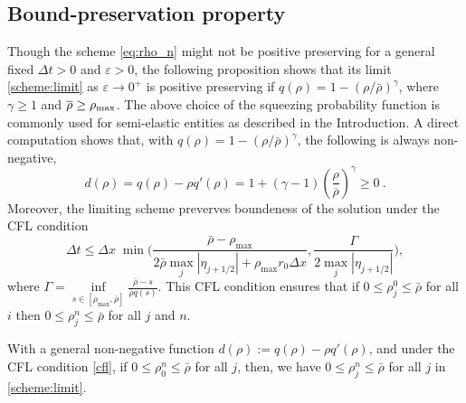 \documentclass[review,onefignum,onetabnum]{siamart220329}
\newcommand {\e}  {\varepsilon}
\newcommand {\dt}   {\Delta t}
\newcommand{\DP}{\color{myblue}}
\begin{document}
\subsection{{Bound-preservation property}}
{\DP Though the scheme \cref{eq:rho_n} might not be positive preserving for a general fixed $\dt > 0$ and $\e>0$, 
the following proposition shows that its limit \cref{scheme:limit} as $\e\to 0^+$ is positive preserving if $q(\rho) = 1 - (\rho / \bar{\rho})^\gamma$, where $\gamma\ge1$ and $\overline{\rho}\ge\rho_{\rm{max}}$.
 The above choice of the squeezing probability function is commonly used  for semi-elastic entities as described in the Introduction. 
 A direct computation shows that, with $q(\rho)= 1 - (\rho / \bar{\rho})^\gamma$, the following is always non-negative, 
\begin{equation*}
    d(\rho)= q(\rho) - \rho q'(\rho) = 1 + (\gamma-1)\left(\frac{\rho}{\overline{\rho}}\right)^{\gamma} \ge 0\ .
\end{equation*}
Moreover, the limiting scheme preverves boundeness of the solution under the CFL condition 
\begin{equation}\label{cfl}
\Delta t \leq \Delta x \; \min \big(\frac{\bar{\rho} - \rho_{\max}}{2 \bar{\rho} \max_j |\eta_{j+1/2}| + \rho_{\max} r_0 \Delta x}, \frac{\Gamma}{2 \max_j |\eta_{j+1/2}|} \big),
\end{equation}
\noindent where $\Gamma = \underset{s\in [\rho_{\max}, \bar{\rho}]}{\inf} \frac{\bar{\rho} - s}{\bar{\rho} q(s)}$. This CFL condition ensures that if $0 \leq \rho_j^0 \leq \bar{\rho}$ for all $i$ then $0 \leq \rho_j^n \leq \bar{\rho}$ for all $j$ and $n$.
}
\begin{proposition} 
 {\DP   With a general non-negative function $d(\rho) :=q(\rho) - \rho q'(\rho)$, and under the CFL condition \eqref{cfl}, if $0 \leq \rho_0^n \leq \bar{\rho}$ for all $j$, then, we have 
    $0 \leq \rho_j^n \leq \bar{\rho}$ for all $j$ in \cref{scheme:limit}.}
\end{proposition}
\end{document}
